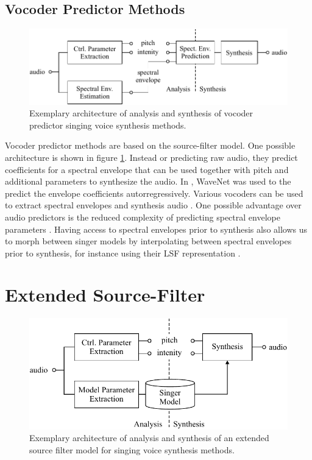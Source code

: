\subsection*{Vocoder Predictor Methods}

\begin{figure}[H]
    \centering
    \includegraphics{Graphics/008_method_vocoder_predictor.pdf}
    \caption{Exemplary architecture of analysis and synthesis of vocoder predictor singing voice synthesis methods. }
    \label{fig:method_vocoder}
\end{figure}

Vocoder predictor methods are based on the source-filter model. One possible architecture is shown in figure \ref{fig:method_vocoder}. Instead or predicting raw audio, they predict coefficients for a spectral envelope that can be used together with pitch and additional parameters to synthesize the audio. In  \cite{blaauw_neural_2017-1}, WaveNet was used to the predict the envelope coefficients autorregressively. Various vocoders can be used to extract spectral envelopes and synthesis audio \cite{morise_world:_2016}. One possible advantage over audio predictors is the reduced complexity of predicting spectral envelope parameters \cite{engel_ddsp:_2020}. Having access to spectral envelopes prior to synthesis also allows us to morph between singer models by interpolating between spectral envelopes prior to synthesis, for instance using their LSF representation \cite{roddy_method_2014}. 

\section*{Extended Source-Filter}
    
\begin{figure}[H]
    \centering
    \includegraphics{Graphics/009_method_extended_source_filter.pdf}
    \caption{Exemplary architecture of analysis and synthesis of an extended source filter model for singing voice synthesis methods. }
    \label{fig:method_esf}
\end{figure}

